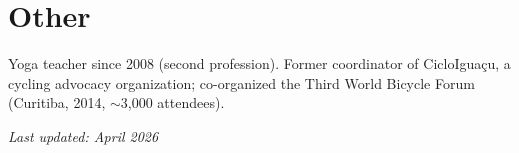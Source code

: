 \documentclass[letterpaper,11pt]{article}
\begin{document}
\section{Other}
\begin{itemize}[leftmargin=0.15in, label={}]
  \small{\item{
    Yoga teacher since 2008 (second profession). Former coordinator of CicloIguaçu, a cycling
    advocacy organization; co-organized the Third World Bicycle Forum (Curitiba, 2014,
    $\sim$3{,}000 attendees).
  }}
\end{itemize}

\vspace{10pt}
\begin{center}
  \small\textit{Last updated: April 2026}
\end{center}
\end{document}

